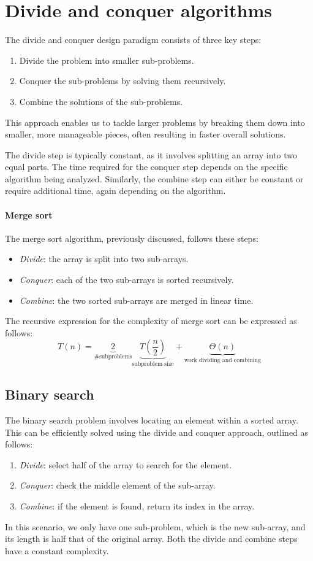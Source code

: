 \section{Divide and conquer algorithms}

The divide and conquer design paradigm consists of three key steps:
\begin{enumerate}
    \item Divide the problem into smaller sub-problems. 
    \item Conquer the sub-problems by solving them recursively. 
    \item Combine the solutions of the sub-problems.
\end{enumerate}
This approach enables us to tackle larger problems by breaking them down into smaller, more manageable pieces, often resulting in faster overall solutions.

The divide step is typically constant, as it involves splitting an array into two equal parts. 
The time required for the conquer step depends on the specific algorithm being analyzed.
Similarly, the combine step can either be constant or require additional time, again depending on the algorithm.

\paragraph*{Merge sort}
The merge sort algorithm, previously discussed, follows these steps:
\begin{itemize}
    \item \textit{Divide}: the array is split into two sub-arrays.
    \item \textit{Conquer}: each of the two sub-arrays is sorted recursively.
    \item \textit{Combine}: the two sorted sub-arrays are merged in linear time.
\end{itemize}
The recursive expression for the complexity of merge sort can be expressed as follows:
\[T(n)=\underbrace{2}_{\#\text{subproblems}} \underbrace{T\left(\dfrac{n}{2}\right)}_{\text{subproblem size}}+\underbrace{\Theta(n)}_\text{work dividing and combining}\]

\subsection{Binary search}
The binary search problem involves locating an element within a sorted array. 
This can be efficiently solved using the divide and conquer approach, outlined as follows:
\begin{enumerate}
    \item \textit{Divide}: select half of the array to search for the element.
    \item \textit{Conquer}: check the middle element of the sub-array.
    \item \textit{Combine}: if the element is found, return its index in the array.
\end{enumerate}
In this scenario, we only have one sub-problem, which is the new sub-array, and its length is half that of the original array.
Both the divide and combine steps have a constant complexity.

